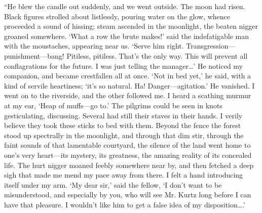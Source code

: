 \documentclass[12pt]{report}
\begin{document}
``He blew the candle out suddenly, and we went outside. The moon had
risen. Black figures strolled about listlessly, pouring water on the
glow, whence proceeded a sound of hissing; steam ascended in the
moonlight, the beaten nigger groaned somewhere. `What a row the brute
makes!' said the indefatigable man with the moustaches, appearing near
us. `Serve him right. Transgression---punishment---bang! Pitiless,
pitiless. That's the only way. This will prevent all conflagrations for
the future. I was just telling the manager\ldots{}' He noticed my
companion, and became crestfallen all at once. `Not in bed yet,' he
said, with a kind of servile heartiness; `it's so natural. Ha!
Danger---agitation.' He vanished. I went on to the riverside, and the
other followed me. I heard a scathing murmur at my ear, `Heap of
muffs---go to.' The pilgrims could be seen in knots gesticulating,
discussing. Several had still their staves in their hands. I verily
believe they took these sticks to bed with them. Beyond the fence the
forest stood up spectrally in the moonlight, and through that dim stir,
through the faint sounds of that lamentable courtyard, the silence of
the land went home to one's very heart---its mystery, its greatness, the
amazing reality of its concealed life. The hurt nigger moaned feebly
somewhere near by, and then fetched a deep sigh that made me mend my
pace away from there. I felt a hand introducing itself under my arm. `My
dear sir,' said the fellow, `I don't want to be misunderstood, and
especially by you, who will see Mr. Kurtz long before I can have that
pleasure. I wouldn't like him to get a false idea of my
disposition\ldots{}.'
\end{document}
